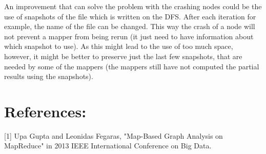 \documentclass[12pt]{article}
\theoremstyle{plain}
\begin{document}
An improvement that can solve the problem with the crashing nodes could be the 
use of snapshots of the file which is written on the DFS. After each iteration
for example, the name of the file can be changed. This way the crash of a node
will not prevent a mapper from being rerun (it just need to have information 
about which snapshot to use). As this might lead to the use of too much space,
however, it might be better to preserve just the last few snapshots, that are
needed by some of the mappers (the mappers still have not computed the partial
results using the snapshots).

\section*{References:} %
\label{sec:References:}
[1] Upa Gupta and Leonidas Fegaras, "Map-Based Graph Analysis on MapReduce" in
  2013 IEEE International Conference on Big Data.
\end{document}
